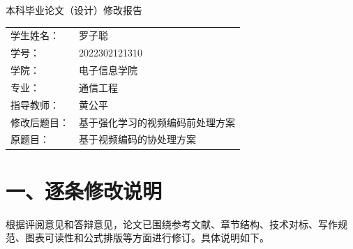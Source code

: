 \documentclass[UTF8,zihao=-4]{ctexart}
\begin{document}
\begin{center}
  {\heiti{} 本科毕业论文（设计）修改报告\par}
  \vspace{1.2em}
  \begin{tabular}{ll}
    学生姓名： & 罗子聪 \\
    学号： & 2022302121310 \\
    学院： & 电子信息学院 \\
    专业： & 通信工程 \\
    指导教师： & 黄公平 \\
    修改后题目： & 基于强化学习的视频编码前处理方案 \\
    原题目： & 基于视频编码的协处理方案 \\
  \end{tabular}
\end{center}

\section*{一、逐条修改说明}

根据评阅意见和答辩意见，论文已围绕参考文献、章节结构、技术对标、写作规范、图表可读性和公式排版等方面进行修订。具体说明如下。
\end{document}
